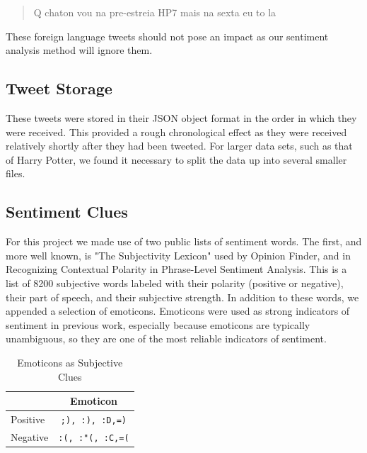 \documentclass[11pt]{article}
\begin{document}
\begin{quote}
Q chaton vou na pre-estreia HP7 mais na sexta eu to la 
\end{quote}

These foreign language tweets should not pose an impact as our sentiment analysis method will ignore them.
\subsection{Tweet Storage}
These tweets were stored in their JSON object format in the order in which they were received. This provided a rough chronological effect as they were received relatively shortly after they had been tweeted. For larger data sets, such as that of Harry Potter, we found it necessary to split the data up into several smaller files.
\subsection{Sentiment Clues}
For this project we made use of two public lists of sentiment words. The first, and more well known, is "The Subjectivity Lexicon" used by Opinion Finder, and in Recognizing Contextual Polarity in Phrase-Level Sentiment Analysis.\cite{wiebe-2005} This is a list of 8200 subjective words labeled with their polarity (positive or negative), their part of speech, and their subjective strength. In addition to these words, we appended a selection of emoticons. Emoticons were used as strong indicators of sentiment in previous work, especially because emoticons are typically unambiguous, so they are one of the most reliable indicators of sentiment.\cite{go-distant}

\begin{table}[ht!]
\centering
\caption{Emoticons as Subjective Clues}
\begin{tabular}{|l|c|}
\hline
 & Emoticon \\
\hline
Positive & \tt{;)}, \tt{:)}, \tt{:D},\tt{=)}\\
\hline
Negative & \tt{:(}, \tt{:"(}, \tt{:C},\tt{=(}\\
\hline
\end{tabular}
\end{table}
\end{document}
